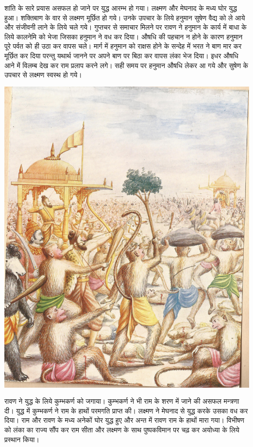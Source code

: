 \documentclass[makeidx, 10pt, oneside, onecolumn, openright, final, svgnames, dvipsnames, extrafontsizes]{memoir}
\begin{document}
शांति के सारे प्रयास असफल हो जाने पर युद्ध आरम्भ हो गया। लक्ष्मण और मेघनाद के मध्य घोर युद्ध हुआ। शक्तिबाण के वार से लक्ष्मण मूर्छित हो गये। उनके उपचार के लिये हनुमान सुषेण वैद्य को ले आये और संजीवनी लाने के लिये चले गये। गुप्तचर से समाचार मिलने पर रावण ने हनुमान के कार्य में बाधा के लिये कालनेमि को भेजा जिसका हनुमान ने वध कर दिया। औषधि की पहचान न होने के कारण हनुमान पूरे पर्वत को ही उठा कर वापस चले। मार्ग में हनुमान को राक्षस होने के सन्देह में भरत ने बाण मार कर मूर्छित कर दिया परन्तु यथार्थ जानने पर अपने बाण पर बिठा कर वापस लंका भेज दिया। इधर औषधि आने में विलम्ब देख कर राम प्रलाप करने लगे। सही समय पर हनुमान औषधि लेकर आ गये और सुषेण के उपचार से लक्ष्मण स्वस्थ हो गये।


 \begin{center}
\includegraphics[scale=0.5]{ravan-vadh.jpg}
\end{center}

रावण ने युद्ध के लिये कुम्भकर्ण को जगाया। कुम्भकर्ण ने भी राम के शरण में जाने की असफल मन्त्रणा दी। युद्ध में कुम्भकर्ण ने राम के हाथों परमगति प्राप्त की। लक्ष्मण ने मेघनाद से युद्ध करके उसका वध कर दिया। राम और रावण के मध्य अनेकों घोर युद्ध हुए और अन्त में रावण राम के हाथों मारा गया। विभीषण को लंका का राज्य सौंप कर राम सीता और लक्ष्मण के साथ पुष्पकविमान पर चढ़ कर अयोध्या के लिये प्रस्थान किया। 
\end{document}
